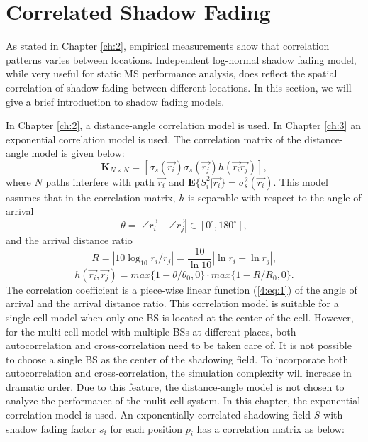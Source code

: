  \section{Correlated Shadow Fading}
 \label{4:CorrShadowField}
 As stated in Chapter \ref{ch:2}, empirical measurements show that correlation patterns varies between locations. Independent log-normal shadow fading model, while very useful for static MS performance analysis, does reflect the spatial correlation of shadow fading between different locations. In this section, we will give a brief introduction to shadow fading models.
 
 In Chapter \ref{ch:2}, a distance-angle correlation model is used. In Chapter \ref{ch:3} an exponential correlation model is used. The correlation matrix of the distance-angle model is given below:
 \begin{equation}
 \mathbf{K}_{N\times N} = [ \sigma_{s}(\vec{r_{i}})\sigma_{s}(\vec{r_{j}})h(\vec{r_{i}}\vec{r_{j}})],
 \label{4:correlationmatrix}
 \end{equation}
 where $N$ paths interfere with path $\vec{r_{i}}$ and $\mathbf{E}\{S_{i}^{2}|\vec{r_{i}}\}=\sigma_{s}^{2}(\vec{r_{i}})$. This model assumes that in the correlation matrix, $h$ is separable with respect to the angle of arrival
 \begin{equation}
 \theta = |\angle\vec{r_{i}}-\angle\vec{r_{j}}|\in [0^{\circ},180^{\circ}],
 \end{equation}
 and the arrival distance ratio
 \begin{equation}
 R=|10\log_{10}r_{i}/r_{j}|=\frac{10}{\ln 10}|\ln r_{i}-\ln r_{j}|,
 \end{equation}
 \begin{equation}
 h(\vec{r_{i}},\vec{r_{j}})=max\{1-\theta/\theta_{0},0\}\cdot max\{1-R/R_{0},0\}.
 \label{4:eq:1}
 \end{equation}
 The correlation coefficient is a piece-wise linear function (\ref{4:eq:1}) of the angle of arrival and the arrival distance ratio. This correlation model is suitable for a single-cell model when only one BS is located at the center of the cell. However, for the multi-cell model with multiple BSs at different places, both autocorrelation and cross-correlation need to be taken care of. It is not possible to choose a single BS as the center of the shadowing field. To incorporate both autocorrelation and cross-correlation, the simulation complexity will increase in dramatic order. Due to this feature, the distance-angle model is not chosen to analyze the performance of the mulit-cell system. In this chapter, the exponential correlation model is used. An exponentially correlated shadowing field $S$ with shadow fading factor $s_{i}$ for each position $p_{i}$ has a correlation matrix as below:

